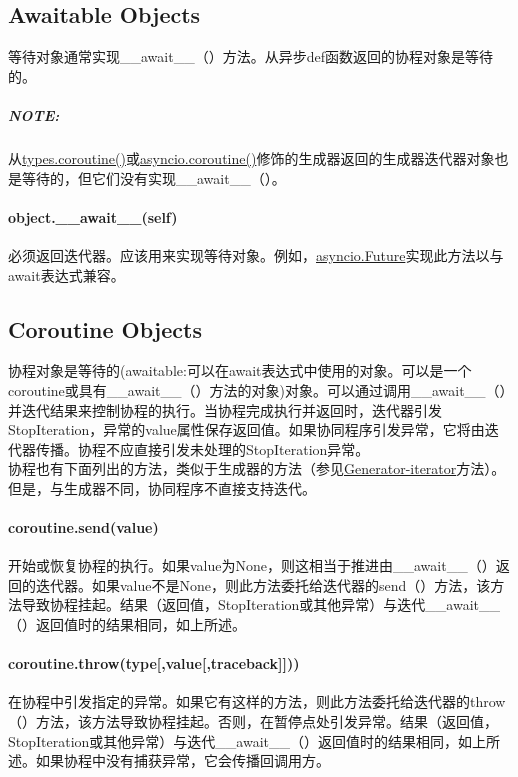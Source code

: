 \documentclass[10pt,UTF8]{ctexart}
\begin{document}
\begin{flushleft}
\subsection{Awaitable Objects}
等待对象通常实现__await__（）方法。从异步def函数返回的协程对象是等待的。\\
\subparagraph{NOTE:}从\href{https://docs.python.org/3/library/types.html#types.coroutine}{types.coroutine()}或\href{https://docs.python.org/3/library/asyncio-task.html#asyncio.coroutine}{asyncio.coroutine()}修饰的生成器返回的生成器迭代器对象也是等待的，但它们没有实现__await__（）。
\paragraph{object.__await__(self)}
必须返回迭代器。应该用来实现等待对象。例如，\href{https://docs.python.org/3/library/asyncio-future.html#asyncio.Future}{asyncio.Future}实现此方法以与await表达式兼容。
\subsection{Coroutine Objects}
协程对象是等待的(awaitable:可以在await表达式中使用的对象。可以是一个coroutine或具有__await__（）方法的对象)对象。可以通过调用__await__（）并迭代结果来控制协程的执行。当协程完成执行并返回时，迭代器引发StopIteration，异常的value属性保存返回值。如果协同程序引发异常，它将由迭代器传播。协程不应直接引发未处理的StopIteration异常。\\
\indent 协程也有下面列出的方法，类似于生成器的方法（参见\href{https://docs.python.org/3/reference/expressions.html#generator-methods}{Generator-iterator}方法）。但是，与生成器不同，协同程序不直接支持迭代。
\paragraph{coroutine.send(value)}开始或恢复协程的执行。如果value为None，则这相当于推进由__await__（）返回的迭代器。如果value不是None，则此方法委托给迭代器的send（）方法，该方法导致协程挂起。结果（返回值，StopIteration或其他异常）与迭代__await__（）返回值时的结果相同，如上所述。
\paragraph{coroutine.throw(type[,value[,traceback]]))}
在协程中引发指定的异常。如果它有这样的方法，则此方法委托给迭代器的throw（）方法，该方法导致协程挂起。否则，在暂停点处引发异常。结果（返回值，StopIteration或其他异常）与迭代__await__（）返回值时的结果相同，如上所述。如果协程中没有捕获异常，它会传播回调用方。

\end{flushleft}
\end{document}
